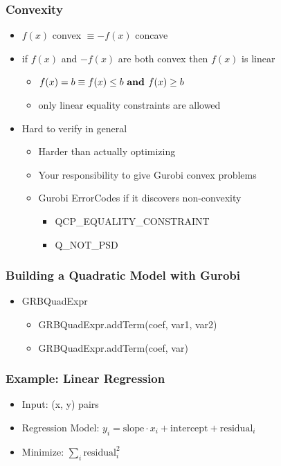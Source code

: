 \documentclass[12pt,handout]{beamer}
\begin{document}
\begin{frame}
  \frametitle{Convexity}
  \begin{itemize}
    \item $f(x)$ convex $\equiv -f(x)$ concave
    \item if $f(x)$ and $-f(x)$ are both convex then $f(x)$ is linear
      \begin{itemize}
        \item $f(x) = b \equiv f(x) \le b \mbox{\ \bf and } f(x) \ge b$
        \item only linear equality constraints are allowed
      \end{itemize}
    \item Hard to verify in general
      \begin{itemize}
        \item Harder than actually optimizing
        \item Your responsibility to give Gurobi convex problems
        \item Gurobi ErrorCodes if it discovers non-convexity
          \begin{itemize}
            \item QCP\_EQUALITY\_CONSTRAINT
            \item Q\_NOT\_PSD
          \end{itemize}
      \end{itemize}
  \end{itemize}
\end{frame}

\begin{frame}
\frametitle{Building a Quadratic Model with Gurobi}
\begin{itemize}
\item GRBQuadExpr
\begin{itemize}
\item GRBQuadExpr.addTerm(coef, var1, var2)
\end{itemize}

\begin{itemize}
\item GRBQuadExpr.addTerm(coef, var)
\end{itemize}
\end{itemize}
\end{frame}

\begin{frame}
\frametitle{Example: Linear Regression}
\begin{itemize}
  \item Input: (x, y) pairs
  \item Regression Model: $y_i = \mbox{slope} \cdot x_i + \mbox{intercept} + \mbox{residual}_i$
  \item Minimize: $\sum_i \mbox{residual}^2_i$
\end{itemize}
\end{frame}
\end{document}
